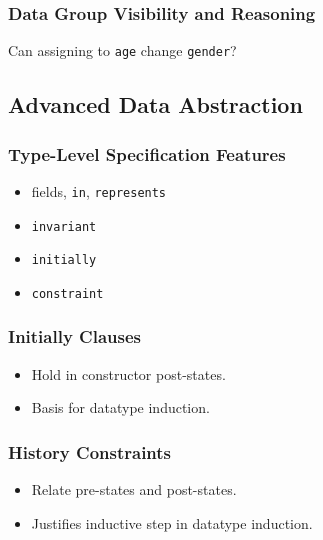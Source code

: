 \begin{frame}[fragile]
\frametitle{Data Group Visibility and Reasoning}

\begin{question}
Can assigning to \lstinline!age! change \lstinline!gender!?
\end{question}
\end{frame}

\subsection[Advanced]{Advanced Data Abstraction}

\begin{frame}[fragile]
\frametitle{Type-Level Specification Features}

\begin{itemize}
\item
fields, \lstinline!in!, \lstinline!represents!

\item
\lstinline!invariant!

\item
\lstinline!initially!

\item
\lstinline!constraint!
\end{itemize}
\end{frame}

\begin{frame}[fragile]
\frametitle{Initially Clauses}

\begin{itemize}
\item
Hold in constructor post-states.

\item
Basis for datatype induction.
\end{itemize}



\end{frame}

\begin{frame}
\frametitle{History Constraints}
\begin{itemize}
\item
Relate pre-states and post-states.

\item
Justifies inductive step in datatype induction.
\end{itemize}
\end{frame}


